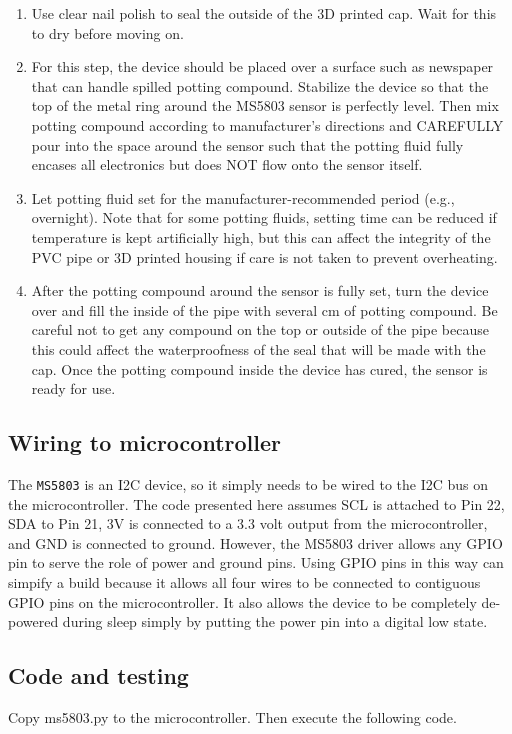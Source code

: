 \begin{enumerate}
    \item Use clear nail polish to seal the outside of the 3D printed cap.  Wait for this to dry before moving on.
  	\item For this step, the device should be placed over a surface such as newspaper that can handle spilled potting compound. Stabilize the device so that the top of the metal ring around the MS5803 sensor is perfectly level. Then mix potting compound according to manufacturer's directions and CAREFULLY pour into the space around the sensor such that the potting fluid fully encases all electronics but does NOT flow onto the sensor itself.
  	\item Let potting fluid set for the manufacturer-recommended period (e.g., overnight). Note that for some potting fluids, setting time can be reduced if temperature is kept artificially high, but this can affect the integrity of the PVC pipe or 3D printed housing if care is not taken to prevent overheating.
    \item After the potting compound around the sensor is fully set, turn the device over and fill the inside of the pipe with several cm of potting compound. Be careful not to get any compound on the top or outside of the pipe because this could affect the waterproofness of the seal that will be made with the cap. Once the potting compound inside the device has cured, the sensor is ready for use.
  \end{enumerate}

  \subsection{Wiring to microcontroller}
  The \texttt{MS5803} is an I2C device, so it simply needs to be wired to the I2C bus on the microcontroller. The code presented here assumes SCL is attached to Pin 22, SDA to Pin 21, 3V is connected to a 3.3 volt output from the microcontroller, and GND is connected to ground. However, the MS5803 driver allows any GPIO pin to serve the role of power and ground pins. Using GPIO pins in this way can simpify a build because it allows all four wires to be connected to contiguous GPIO pins on the microcontroller. It also allows the device to be completely de-powered during sleep simply by putting the power pin into a digital low state.

  \subsection{Code and testing}
  Copy ms5803.py to the microcontroller. Then execute the following code.


